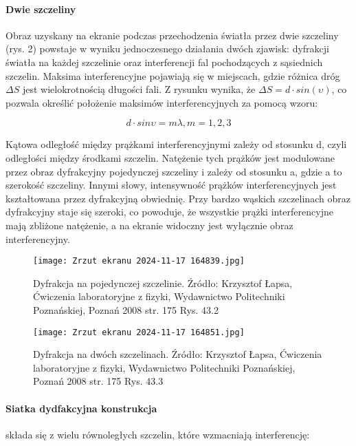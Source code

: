 \documentclass{article}
\begin{document}
\FloatBarrier

\paragraph{Dwie szczeliny} Obraz uzyskany na ekranie podczas przechodzenia światła przez dwie szczeliny (rys. 2) powstaje w wyniku jednoczesnego działania dwóch zjawisk: dyfrakcji światła na każdej szczelinie oraz interferencji fal pochodzących z sąsiednich szczelin. Maksima interferencyjne pojawiają się w miejscach, gdzie różnica dróg $\Delta S$ jest wielokrotnością długości fali. Z rysunku wynika, że $\Delta S = d \cdot sin(\upsilon)$, co pozwala określić położenie maksimów interferencyjnych za pomocą wzoru: 

\begin{equation}
    d \cdot sin \upsilon = m \lambda, m = 1, 2, 3
\end{equation}

Kątowa odległość między prążkami interferencyjnymi zależy od stosunku d, czyli odległości między środkami szczelin. Natężenie tych prążków jest modulowane przez obraz dyfrakcyjny pojedynczej szczeliny i zależy od stosunku a, gdzie a to szerokość szczeliny. Innymi słowy, intensywność prążków interferencyjnych jest kształtowana przez dyfrakcyjną obwiednię. Przy bardzo wąskich szczelinach obraz dyfrakcyjny staje się szeroki, co powoduje, że wszystkie prążki interferencyjne mają zbliżone natężenie, a na ekranie widoczny jest wyłącznie obraz interferencyjny.

\begin{figure}
    \centering
    \texttt{[image: Zrzut ekranu 2024-11-17 164839.jpg]}
    \caption{Dyfrakcja na pojedynczej szczelinie. Źródło:  Krzysztof Łapsa, Ćwiczenia laboratoryjne z fizyki, Wydawnictwo Politechniki Poznańskiej, Poznań 2008 str. 175  Rys. 43.2}
    \label{fig:enter-label}
\end{figure}

\begin{figure}
    \centering
    \texttt{[image: Zrzut ekranu 2024-11-17 164851.jpg]}
    \caption{Dyfrakcja na dwóch szczelinach. Źródło:  Krzysztof Łapsa, Ćwiczenia laboratoryjne z fizyki, Wydawnictwo Politechniki Poznańskiej, Poznań 2008 str. 175  Rys. 43.3 }
    \label{fig:enter-label}
\end{figure}


\paragraph{Siatka dydfakcyjna konstrukcja} składa się z wielu równoległych szczelin, które wzmacniają interferencję:
\end{document}
